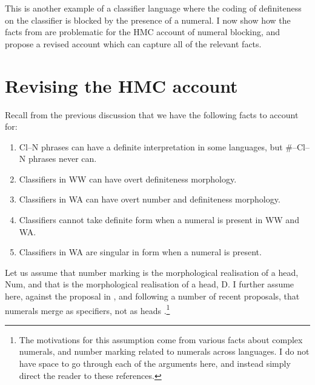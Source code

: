 \documentclass[output=paper
,modfonts
,nonflat]{langsci/langscibook}
\begin{document}
\ea 
{}

\z 
\z 

This is another example of a classifier language where the coding of definiteness on the classifier is blocked by the presence of a numeral. I now show how the facts from  are problematic for the HMC account of numeral blocking, and propose a revised account which can capture all of the relevant facts.

\section{Revising the HMC account}

Recall from the previous discussion that we have the following facts to account for:

\begin{enumerate}
\item Cl--N phrases can have a definite interpretation in some languages, but \#--Cl--N phrases never can.
\item Classifiers in WW can have overt definiteness morphology.
\item Classifiers in WA can have overt number and definiteness morphology.
\item Classifiers cannot take definite form when a numeral is present in WW and WA.
\item Classifiers in WA are singular in form when a numeral is present.
\end{enumerate}

Let us assume that number marking is the morphological realisation of a head, Num, and that  is the morphological realisation of a head, D. I further assume here, against the proposal in \citet{Simpson2005}, and following a number of recent proposals, that numerals merge as specifiers, not as heads \citep{Cinque2005,Borer2005,Ionin2006,Ouwayda2014}.\footnote{The motivations for this assumption come from various facts about complex numerals, and number marking related to numerals across languages. I do not have space to go through each of the arguments here, and instead simply direct the reader to these references.}  
\end{document}
